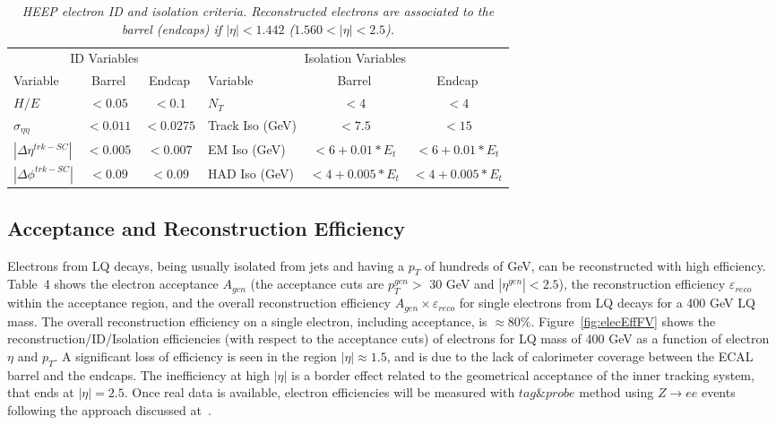 \begin{table}[htbp]
  \label{tab:HEEPselection}
  \begin{center}
    \begin{tabular}{|lcc|lcc|} \hline
      \multicolumn{3}{|c|}{ID Variables} & \multicolumn{3}{|c|}{Isolation Variables} \\ 
      Variable & Barrel & Endcap & Variable & Barrel & Endcap  \\ \hline
      $H/E$  & $<0.05$ & $<0.1$ & $N_T$  & $<4$ & $<4$ \\ \hline
      $\sigma_{\eta\eta}$  & $<0.011$ & $<0.0275$ & Track Iso (GeV) & $<7.5$ & $<15$ \\ \hline
      $|\Delta\eta^{trk-SC}|$ & $<0.005$ & $<0.007$ & EM Iso (GeV) & $<6+0.01*E_{t}$ & $<6+0.01*E_{t}$ \\ \hline
      $|\Delta\phi^{trk-SC}|$ & $<0.09$ & $<0.09$ & HAD Iso (GeV) & $<4+0.005*E_{t}$ & $<4+0.005*E_{t}$ \\ \hline
    \end{tabular}
  \caption{\small \sl HEEP electron ID and isolation criteria. Reconstructed electrons are associated to the 
    barrel (endcaps) if $|\eta|<1.442$ ($1.560<|\eta|<2.5$).}
  \end{center}
\end{table}


\subsection{Acceptance and Reconstruction Efficiency} \label{sec:electronEfficiency}

Electrons from LQ decays, being usually isolated from jets and having a $p_{T}$ of 
hundreds of GeV, can be reconstructed with high efficiency. 
Table~4
shows the electron acceptance $A_{gen}$ (the acceptance cuts are $p_{T}^{gen}>$ 30 GeV 
and $|\eta^{gen}|<2.5$), the reconstruction efficiency $\varepsilon_{reco}$ within the acceptance 
region, and the overall reconstruction efficiency $A_{gen} \times \varepsilon_{reco}$ 
for single electrons from LQ decays for a 400 GeV LQ mass.
The overall reconstruction efficiency on a single electron, including acceptance, is $\approx 80\%$.
Figure~\ref{fig:elecEffFV} shows the reconstruction/ID/Isolation efficiencies
(with respect to the acceptance cuts) of electrons for LQ mass of 400 GeV as a function of electron $\eta$ and $p_{T}$. 
A significant loss of efficiency is seen in the region $|\eta| \approx 1.5$, 
and is due to the lack of calorimeter coverage between the ECAL barrel and the endcaps. 
The inefficiency at high $|\eta|$ is a border effect related to the 
geometrical acceptance of the inner tracking system, that ends at $|\eta| = 2.5$.
Once real data is available, electron efficiencies will be measured 
with $tag\&probe$ method using $Z \rightarrow ee$ events 
following the approach discussed at~\cite{TagAndProbe}. \\

